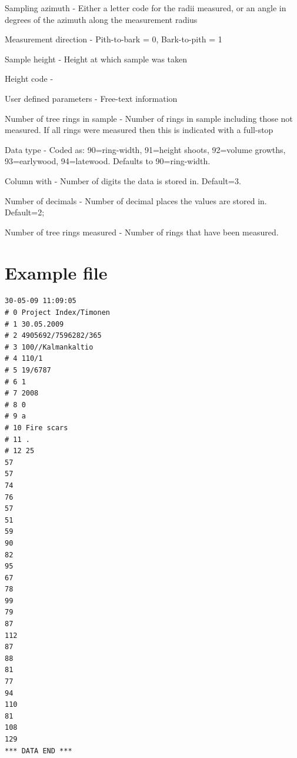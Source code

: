 \begin{description*}
 \item[Sampling azimuth] - Either a letter code for the radii measured, or an angle in degrees of the azimuth along the measurement radius
 \item[Measurement direction] - Pith-to-bark = 0, Bark-to-pith = 1
 \item[Sample height] - Height at which sample was taken
 \item[Height code] - 
 \item[User defined parameters] - Free-text information
 \item[Number of tree rings in sample] - Number of rings in sample including those not measured.  If all rings were measured then this is indicated with a full-stop
 \item[Data type] - Coded as: 90=ring-width, 91=height shoots, 92=volume growths, 93=earlywood, 94=latewood.  Defaults to 90=ring-width.
 \item[Column with] - Number of digits the data is stored in. Default=3.
 \item[Number of decimals] - Number of decimal places the values are stored in.  Default=2;
 \item[Number of tree rings measured] - Number of rings that have been measured.
\end{description*}

\section{Example file}

\begin{lstlisting}
30-05-09 11:09:05
# 0 Project Index/Timonen
# 1 30.05.2009
# 2 4905692/7596282/365
# 3 100//Kalmankaltio
# 4 110/1
# 5 19/6787
# 6 1
# 7 2008
# 8 0
# 9 a
# 10 Fire scars
# 11 .
# 12 25
57
57
74
76
57
51
59
90
82
95
67
78
99
79
87
112
87
88
81
77
94
110
81
108
129
*** DATA END ***
\end{lstlisting}


